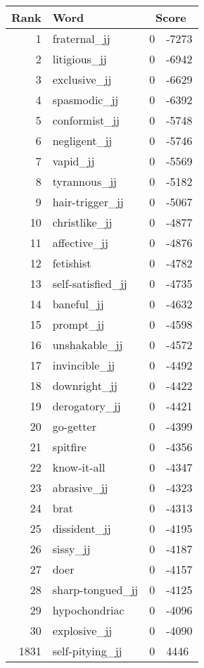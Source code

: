 \begin{longtable}[!htbp]{| rlr@{.}l |}
    \hline
    \textbf{Rank} & \textbf{Word} & \multicolumn{2}{c|}{\textbf{Score}} \\
    \hline
    \endhead
    1 & fraternal\_jj & 0 & -7273 \\
    2 & litigious\_jj & 0 & -6942 \\
    3 & exclusive\_jj & 0 & -6629 \\
    4 & spasmodic\_jj & 0 & -6392 \\
    5 & conformist\_jj & 0 & -5748 \\
    6 & negligent\_jj & 0 & -5746 \\
    7 & vapid\_jj & 0 & -5569 \\
    8 & tyrannous\_jj & 0 & -5182 \\
    9 & hair-trigger\_jj & 0 & -5067 \\
    10 & christlike\_jj & 0 & -4877 \\
    11 & affective\_jj & 0 & -4876 \\
    12 & fetishist & 0 & -4782 \\
    13 & self-satisfied\_jj & 0 & -4735 \\
    14 & baneful\_jj & 0 & -4632 \\
    15 & prompt\_jj & 0 & -4598 \\
    16 & unshakable\_jj & 0 & -4572 \\
    17 & invincible\_jj & 0 & -4492 \\
    18 & downright\_jj & 0 & -4422 \\
    19 & derogatory\_jj & 0 & -4421 \\
    20 & go-getter & 0 & -4399 \\
    21 & spitfire & 0 & -4356 \\
    22 & know-it-all & 0 & -4347 \\
    23 & abrasive\_jj & 0 & -4323 \\
    24 & brat & 0 & -4313 \\
    25 & dissident\_jj & 0 & -4195 \\
    26 & sissy\_jj & 0 & -4187 \\
    27 & doer & 0 & -4157 \\
    28 & sharp-tongued\_jj & 0 & -4125 \\
    29 & hypochondriac & 0 & -4096 \\
    30 & explosive\_jj & 0 & -4090 \\
    1831 & self-pitying\_jj & 0 & 4446 \\

\end{longtable}

